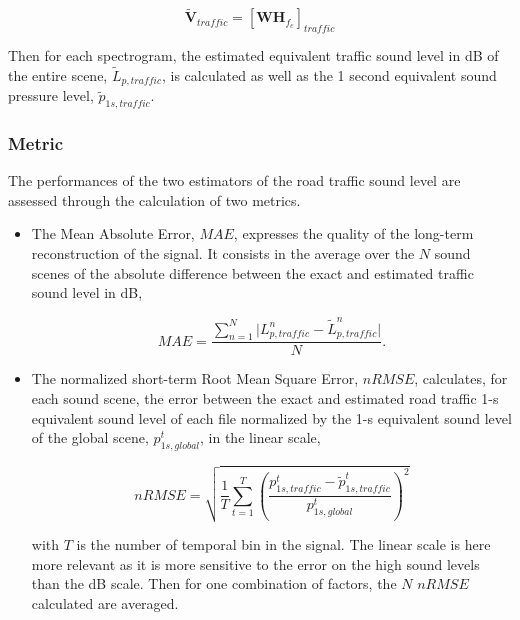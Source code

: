 \documentclass[twocolumn,a4paper,10pt]{article}
\begin{document}
\begin{equation}
\mathbf{\tilde{V}}_{traffic} = \left[\mathbf{WH}_{f_c}\right]_{traffic}
\end{equation}

Then for each spectrogram, the estimated equivalent traffic sound level in dB of the entire scene, $\tilde{L}_{p,traffic}$, is calculated as well as the 1 second equivalent sound pressure level, $\tilde{p}_{1s,traffic}$. 

\subsubsection{Metric}
The performances of the two estimators of the road traffic sound level are assessed through the calculation of two metrics. 

\begin{itemize}

\item The Mean Absolute Error, $MAE$, expresses the quality of the long-term reconstruction of the signal. It consists in the average over the $N$ sound scenes of the absolute difference between the exact and estimated traffic sound level in dB, 

\begin{equation}
MAE = \frac{\sum_{n = 1}^N\vert L^n_{p,traffic}-\tilde{L}^n_{p,traffic} \vert}{N}.
\end{equation}



%
%

\item The normalized short-term Root Mean Square Error, $nRMSE$, calculates, for each sound scene, the error between the exact and estimated road traffic 1-s equivalent sound level of each file normalized by the 1-s equivalent sound level of the global scene, $p^t_{1s,global}$, in the linear scale, 

\begin{equation}
nRMSE = \sqrt{\frac{1}{T}\sum_{t = 1}^T \left(\frac{p^t_{1s,traffic}-\tilde{p}^t_{1s,traffic}}{p^t_{1s,global}}\right)^2}
\end{equation}

with $T$ is the number of temporal bin in the signal. The linear scale is here more relevant as it is more sensitive to the error on the high sound levels than the dB scale. Then for one combination of factors, the $N$ $nRMSE$ calculated are averaged.\\
\end{itemize}
\end{document}
